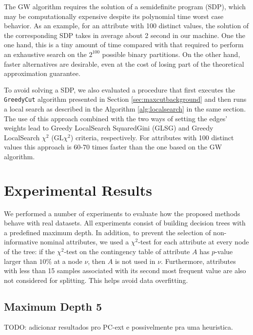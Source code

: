 The GW algorithm  requires  the solution of a semidefinite program (SDP),
which may be computationally expensive despite  its 
polynomial time worst case  behavior.
As an example, for an attribute with 100 distinct values, the solution of
the corresponding SDP takes in average about 2 second in our machine.
One the one hand, this is a tiny amount of time 
compared with that required to perform an exhaustive search on the $2^{100}$
possible binary partitions. On the other hand, 
 faster alternatives are desirable, even
at the cost of losing part of the theoretical approximation guarantee. 

To avoid solving a SDP, 
we also evaluated a procedure
that first executes the {\tt GreedyCut} algorithm presented
in Section \ref{sec:maxcutbackground} and then runs a local search as described
in the Algorithm  \ref{alg:localsearch} in the same section. 
The use of this approach combined with the two
ways of setting the edges' weights lead to
 Greedy LocalSearch SquaredGini (GLSG) and 
Greedy LocalSearch $\chi^2$ (GL$\chi^2$) 
criteria, respectively.
For attributes with 100 distinct values this approach is 60-70
times faster than the one based on the GW algorithm.


\section{Experimental Results}

We performed a number of experiments to evaluate how the
proposed methods behave with real datasets.
All experiments consist of building decision trees
with a predefined maximum depth.  In addition,
to prevent the selection of non-informative nominal attributes, 
we used a $\chi^2$-test for each attribute at every node of
the tree: if the $\chi^2$-test  on the contingency table of attribute $A$
has $p$-value larger than $10\%$ at a node $\nu$, then
$A$ is not used in $\nu$. Furthermore, attributes with less than 15 samples associated with its
second most frequent value are also not considered for splitting. This helps  avoid data overfitting.


\subsection{Maximum Depth 5}

TODO: adicionar resultados pro PC-ext e possivelmente pra uma heuristica.

